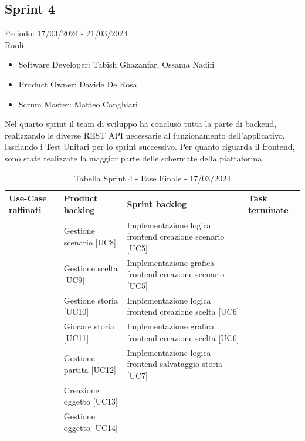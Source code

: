 \documentclass{article}
\begin{document}
\clearpage
\subsection{Sprint 4}
Periodo: 17/03/2024 - 21/03/2024\vspace*{7pt}\\
Ruoli:
\begin{itemize}[label = { }]
    \itemsep0em
    \item Software Developer: Tabish Ghazanfar, Ossama Nadifi 
    \item Product Owner: Davide De Rosa
    \item Scrum Master: Matteo Canghiari
\end{itemize}
Nel quarto sprint il team di sviluppo ha concluso tutta la parte di backend, realizzando le diverse REST API necessarie al funzionamento dell’applicativo, lasciando i Test Unitari per lo sprint successivo. Per quanto riguarda il frontend, sono state realizzate la maggior parte delle schermate della piattaforma.

\begin{table}[h]
    \centering
    \begin{tabularx}{\textwidth}{|X|X|X|X|}
        \hline
        \bf Use-Case raffinati & \bf Product backlog & \bf Sprint backlog & \bf Task terminate \\
        \hline
        & Gestione scenario [UC8] & Implementazione logica frontend creazione scenario [UC5] & \\
        \hline
        & Gestione scelta [UC9] & Implementazione grafica frontend creazione scenario [UC5] & \\
        \hline
        & Gestione storia [UC10] & Implementazione logica frontend creazione scelta [UC6] & \\
        \hline
        & Giocare storia [UC11] & Implementazione grafica frontend creazione scelta [UC6] & \\
        \hline
        & Gestione partita [UC12] & Implementazione logica frontend salvataggio storia [UC7] & \\
        \hline
        & Creazione oggetto [UC13] &  & \\
        \hline
        & Gestione oggetto [UC14] &  & \\
        \hline
    \end{tabularx}
    \caption*{Tabella Sprint 4 - Fase Finale - 17/03/2024}
\end{table}
\end{document}
